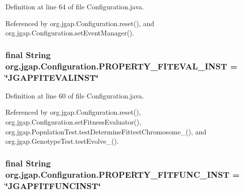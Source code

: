 Definition at line 64 of file Configuration.\-java.



Referenced by org.\-jgap.\-Configuration.\-reset(), and org.\-jgap.\-Configuration.\-set\-Event\-Manager().

\hypertarget{classorg_1_1jgap_1_1_configuration_a82802b737a9a40bb3ae67853cf041a4f}{
\subsubsection[{P\-R\-O\-P\-E\-R\-T\-Y\-\_\-\-F\-I\-T\-E\-V\-A\-L\-\_\-\-I\-N\-S\-T}]{\setlength{\rightskip}{0pt plus 5cm}final String org.\-jgap.\-Configuration.\-P\-R\-O\-P\-E\-R\-T\-Y\-\_\-\-F\-I\-T\-E\-V\-A\-L\-\_\-\-I\-N\-S\-T = \char`\"{}J\-G\-A\-P\-F\-I\-T\-E\-V\-A\-L\-I\-N\-S\-T\char`\"{}\hspace{0.3cm}{\ttfamily [static]}}}\label{classorg_1_1jgap_1_1_configuration_a82802b737a9a40bb3ae67853cf041a4f}


Definition at line 60 of file Configuration.\-java.



Referenced by org.\-jgap.\-Configuration.\-reset(), org.\-jgap.\-Configuration.\-set\-Fitness\-Evaluator(), org.\-jgap.\-Population\-Test.\-test\-Determine\-Fittest\-Chromosome\-\_(), and org.\-jgap.\-Genotype\-Test.\-test\-Evolve\-\_().

\hypertarget{classorg_1_1jgap_1_1_configuration_aee9fd3983e9a19a0031d5361919a6890}{
\subsubsection[{P\-R\-O\-P\-E\-R\-T\-Y\-\_\-\-F\-I\-T\-F\-U\-N\-C\-\_\-\-I\-N\-S\-T}]{\setlength{\rightskip}{0pt plus 5cm}final String org.\-jgap.\-Configuration.\-P\-R\-O\-P\-E\-R\-T\-Y\-\_\-\-F\-I\-T\-F\-U\-N\-C\-\_\-\-I\-N\-S\-T = \char`\"{}J\-G\-A\-P\-F\-I\-T\-F\-U\-N\-C\-I\-N\-S\-T\char`\"{}\hspace{0.3cm}{\ttfamily [static]}}}\label{classorg_1_1jgap_1_1_configuration_aee9fd3983e9a19a0031d5361919a6890}



